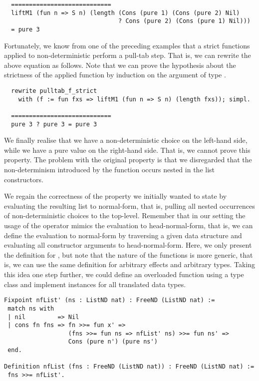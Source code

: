 \begin{verbatim}
  ============================
  liftM1 (fun n => S n) (length (Cons (pure 1) (Cons (pure 2) Nil)
                                ? Cons (pure 2) (Cons (pure 1) Nil)))
  = pure 3
\end{verbatim}

Fortunately, we know from one of the preceding examples that a strict
functions applied to non-deterministic perform a pull-tab step.
That is, we can rewrite the above equation as follows.
Note that we can prove the hypothesis about the strictness of the
applied function  by induction on
the argument of type .

\begin{verbatim}
  rewrite pulltab_f_strict
    with (f := fun fxs => liftM1 (fun n => S n) (length fxs)); simpl.

  ============================
  pure 3 ? pure 3 = pure 3
\end{verbatim}

We finally realise that we have a non-deterministic choice on the
left-hand side, while we have a pure value on the right-hand side.
That is, we cannot prove this property.
The problem with the original property is that we disregarded that the
non-determinism introduced by the function  occurs
nested in the list constructors.

We regain the correctness of the property we initially wanted to state
by evaluating the resulting list to normal-form, that is, pulling all
nested occurrences of non-deterministic choices to the top-level.
Remember that in our setting the usage of the operator \cinl{>>=}
mimics the evaluation to head-normal-form, that is, we can define the
evaluation to normal-form by traversing a given data structure and
evaluating all constructor arguments to head-normal-form.
Here, we only present the definition for , but note that
the nature of the functions is more generic, that is, we can use the
same definition for arbitrary effects and arbitrary types.
Taking this idea one step further, we could define an overloaded
function  using a type class and implement instances for all
translated data types.

\begin{verbatim}
Fixpoint nfList' (ns : ListND nat) : FreeND (ListND nat) :=
 match ns with
 | nil         => Nil
 | cons fn fns => fn >>= fun x' =>
                  (fns >>= fun ns => nfList' ns) >>= fun ns' =>
                  Cons (pure n') (pure ns')
 end.

Definition nfList (fns : FreeND (ListND nat)) : FreeND (ListND nat) :=
 fns >>= nfList'.
\end{verbatim}

